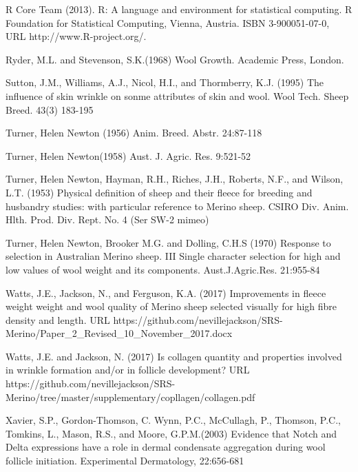 \documentclass[titlepage]{article}  %
\begin{document}
\begin{thebibliography}{99}
R Core Team (2013). R: A language and environment for statistical
  computing. R Foundation for Statistical Computing, Vienna, Austria.
  ISBN 3-900051-07-0, URL http://www.R-project.org/.

Ryder, M.L. and Stevenson, S.K.(1968) Wool Growth. Academic Press, London.

Sutton, J.M., Williams, A.J., Nicol, H.I., and Thormberry, K.J. (1995) The influence of skin wrinkle on sonme attributes of skin and wool. Wool Tech. Sheep Breed. 43(3) 183-195

Turner, Helen Newton (1956) Anim. Breed. Abstr. 24:87-118

Turner, Helen Newton(1958) Aust. J. Agric. Res. 9:521-52

Turner, Helen Newton, Hayman, R.H., Riches, J.H., Roberts, N.F., and Wilson, L.T. (1953) Physical definition of sheep and their fleece for breeding and husbandry studies: with particular reference to Merino sheep. CSIRO Div. Anim. Hlth. Prod. Div. Rept. No. 4 (Ser SW-2 mimeo)

Turner, Helen Newton, Brooker M.G. and Dolling, C.H.S (1970) Response to selection in Australian Merino sheep. III Single character selection for high and low values of wool weight and its components. Aust.J.Agric.Res. 21:955-84

Watts, J.E., Jackson, N., and Ferguson, K.A. (2017) Improvements in fleece weight weight and wool quality of Merino sheep selected visually for high fibre density and length. URL https://github.com/nevillejackson/SRS-Merino/Paper\_2\_Revised\_10\_November\_2017.docx 

Watts, J.E. and Jackson, N. (2017) Is collagen quantity and properties involved in wrinkle formation and/or in follicle development? URL https://github.com/nevillejackson/SRS-Merino/tree/master/supplementary/copllagen/collagen.pdf

Xavier, S.P., Gordon-Thomson, C. Wynn, P.C., McCullagh, P., Thomson, P.C., Tomkins, L., Mason, R.S., and Moore, G.P.M.(2003) Evidence that Notch and Delta expressions have a role in dermal condensate aggregation during wool follicle initiation. Experimental Dermatology, 22:656-681

\end{thebibliography}
\end{document}
